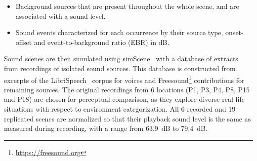 \documentclass[11pt,a4paper]{article}
\begin{document}
\begin{itemize}
\item Background sources that are present throughout the whole scene, and are associated with a sound level.
\item Sound events characterized for each occurrence by their source type, onset-offset and event-to-background ratio (EBR) in dB.
\end{itemize}

Sound scenes are then simulated using simScene~\cite{rossignol2015} with a database of extracts from recordings of isolated sound sources. This database is constructed from excerpts of the LibriSpeech~\cite{panayotov2015} corpus for voices and Freesound\footnote{\url{https://freesound.org}} contributions for remaining sources. The original recordings from 6 locations (P1, P3, P4, P8, P15 and P18) are chosen for perceptual comparison, as they explore diverse real-life situations with respect to environment categorization. All 6 recorded and 19 replicated scenes are normalized so that their playback sound level is the same as measured during recording, with a range from 63.9~dB to 79.4~dB.\\
\end{document}
